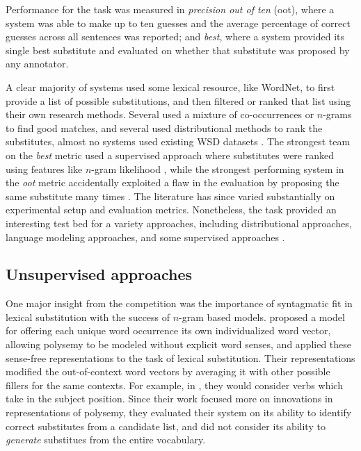 Performance for the task was measured in {\em precision out of ten} (oot),
where a system was able to make up to ten guesses and the average percentage
of correct guesses across all sentences was reported; and {\em best}, where
a system provided its single best substitute and evaluated on whether that
substitute was proposed by any annotator.

A clear majority of systems used some lexical resource, like WordNet, to first
provide a list of possible substitutions, and then filtered or ranked that list
using their own research methods. Several used a mixture of co-occurrences or
$n$-grams to find good matches, and several used distributional methods to rank
the substitutes, almost no systems used existing WSD datasets
\cite{mccarthy:2007:semeval}. The strongest team on the {\em best} metric used a
supervised approach where substitutes were ranked
using features like $n$-gram likelihood \cite{yuret:2007:semeval}, while
the strongest performing system in the {\em oot} metric accidentally exploited
a flaw in the evaluation by proposing the same substitute many times
\cite{giuliano:2007:semeval}. The
literature has since varied substantially on experimental setup and evaluation
metrics. Nonetheless, the task provided an interesting test bed for a
variety approaches, including distributional approaches, language modeling
approaches, and some supervised approaches \cite{szarvas:2013:naacl}.

\subsection{Unsupervised approaches}

One major insight from the competition was the importance of syntagmatic fit in
lexical substitution with the success of $n$-gram based models.
 proposed a model for offering each unique word
occurrence its own individualized word vector, allowing polysemy to be modeled
without explicit word senses, and applied these sense-free representations
to the task of lexical substitution. Their representations modified the
out-of-context word vectors by averaging it with other possible fillers for
the same contexts.
For example, in , they would consider
verbs which take  in the subject position. Since their
work focused more on innovations in representations of polysemy, they
evaluated their system on its ability to identify correct substitutes from
a candidate list, and did not consider its ability to {\em generate} substitues
from the entire vocabulary.


